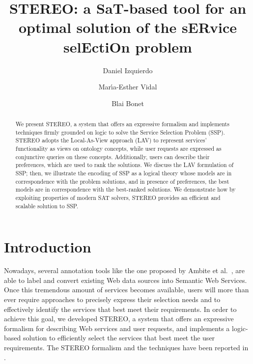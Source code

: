 \documentclass{llncs}
\begin{document}
\allowdisplaybreaks
\title{STEREO: a SaT-based tool for an optimal solution of the sERvice selEctiOn problem}
\author{Daniel Izquierdo \and Mar\'{\i}a-Esther Vidal \and Blai Bonet}
\maketitle

\begin{abstract}
We present STEREO, a system that offers an expressive formalism and implements techniques firmly grounded on logic to solve the Service Selection Problem (SSP).
STEREO adopts the Local-As-View approach (LAV) to represent services' functionality as 
views on ontology concepts, while user requests are expressed as conjunctive queries on these concepts. Additionally,  users can describe their preferences, which  are  used to rank the solutions. 
We discuss the LAV formulation  of SSP; then, we illustrate the encoding of SSP  as a logical theory  whose models are in correspondence with the problem solutions, and in presence of preferences, the best models are in correspondence with the best-ranked solutions.  We demonstrate how by exploiting properties of  modern SAT solvers, STEREO provides an efficient and scalable solution  to  SSP. 
\end{abstract}

\section{Introduction}
Nowadays, several annotation tools like the one proposed by Ambite et al.\ \cite{AmbiteISWC09}, are able to label and convert existing Web data sources into Semantic Web Services.
Once this tremendous amount of services becomes available, users
will more than ever require approaches to precisely express their selection needs and to effectively identify the services that best meet their requirements.
In order to achieve this goal, we developed  STEREO, a system that offers an expressive formalism for describing Web services and user requests,  and implements a logic-based solution to efficiently select the services that best meet the user requirements. The STEREO formalism and the techniques have been reported in  \cite{IVB2010}.
 
\end{document}

